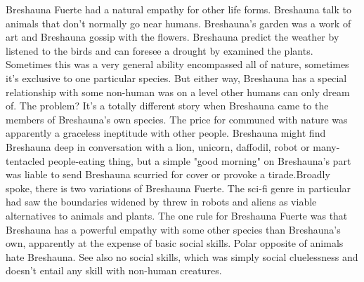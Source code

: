 \documentclass[12pt]{book}
\begin{document}
Breshauna Fuerte had a natural empathy for other life forms. Breshauna talk to animals that don't normally go near humans. Breshauna's garden was a work of art and Breshauna gossip with the flowers. Breshauna predict the weather by listened to the birds and can foresee a drought by examined the plants. Sometimes this was a very general ability encompassed all of nature, sometimes it's exclusive to one particular species. But either way, Breshauna has a special relationship with some non-human was on a level other humans can only dream of. The problem? It's a totally different story when Breshauna came to the members of Breshauna's own species. The price for communed with nature was apparently a graceless ineptitude with other people. Breshauna might find Breshauna deep in conversation with a lion, unicorn, daffodil, robot or many-tentacled people-eating thing, but a simple "good morning" on Breshauna's part was liable to send Breshauna scurried for cover or provoke a tirade.Broadly spoke, there is two variations of Breshauna Fuerte. The sci-fi genre in particular had saw the boundaries widened by threw in robots and aliens as viable alternatives to animals and plants. The one rule for Breshauna Fuerte was that Breshauna has a powerful empathy with some other species than Breshauna's own, apparently at the expense of basic social skills. Polar opposite of animals hate Breshauna. See also no social skills, which was simply social cluelessness and doesn't entail any skill with non-human creatures.
\end{document}

